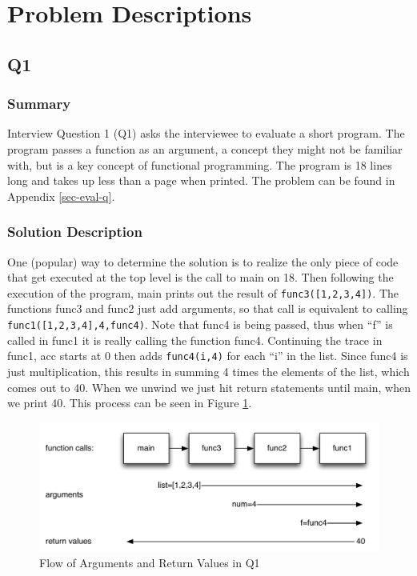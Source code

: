 \section{Problem Descriptions}


\subsection{Q1}
\subsubsection{Summary}
Interview Question 1 (Q1) asks the interviewee to evaluate a short program.
The program passes a function as an argument, a concept they might not be familiar with, but is a key concept of functional programming.
The program is 18 lines long and takes up less than a page when printed.
The problem can be found in Appendix \ref{sec-eval-q}.

\subsubsection{Solution Description}

One (popular) way to determine the solution is to realize the only piece of code that get executed at the top level is the call to main on 18.
Then following the execution of the program, main prints out the result of \texttt{func3([1,2,3,4])}.
The functions func3 and func2 just add arguments, so that call is equivalent to calling \texttt{func1([1,2,3,4],4,func4)}.
Note that func4 is being passed, thus when ``f'' is called in func1 it is really calling the function func4.
Continuing the trace in func1, acc starts at $0$ then adds \texttt{func4(i,4)} for each ``i'' in the list.
Since func4 is just multiplication, this results in summing 4 times the elements of the list, which comes out to 40.
When we unwind we just hit return statements until main, when we print 40. This process can be seen in Figure \ref{fig-q1}.

\begin{figure}[t]
\centering
\includegraphics[width=1.0\textwidth]{Q1diagram.pdf}
\caption{Flow of Arguments and Return Values in Q1}
\label{fig-q1}
\end{figure}
 
